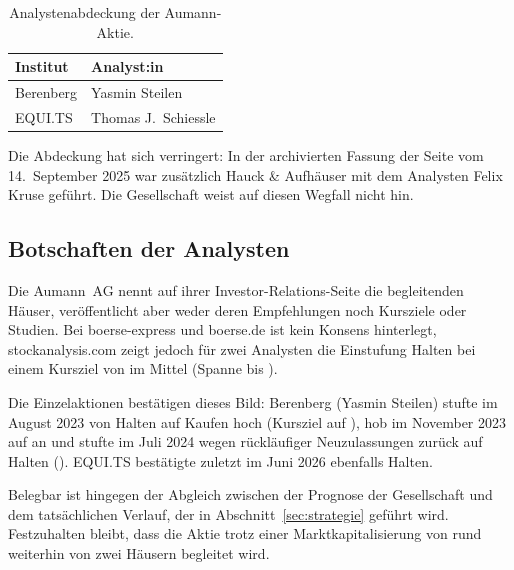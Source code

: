 \begin{table}[htbp]
\centering
\caption{Analystenabdeckung der Aumann-Aktie.}
\label{tab:analysten}
\begin{tabular}{@{}ll@{}}
\toprule
\textbf{Institut} & \textbf{Analyst:in}\\
\midrule
Berenberg            & Yasmin Steilen\\
EQUI.TS              & Thomas J.\ Schiessle\\
\bottomrule
\end{tabular}
\end{table}

\noindent Die Abdeckung hat sich verringert: In der archivierten Fassung der
Seite vom 14.~September 2025 war zus\"atzlich Hauck \& Aufh\"auser mit dem
Analysten Felix Kruse gef\"uhrt. Die Gesellschaft
weist auf diesen Wegfall nicht hin.

\subsection{Botschaften der Analysten}
\label{subsec:analystenbotschaften}

Die Aumann~AG nennt auf ihrer Investor-Relations-Seite die begleitenden
H\"auser, ver\"offentlicht aber weder deren Empfehlungen noch Kursziele oder
Studien. Bei boerse-express und boerse.de ist
kein Konsens hinterlegt,
stockanalysis.com zeigt jedoch f\"ur zwei Analysten die Einstufung Halten
bei einem Kursziel von im Mittel \EURje{\KurszielKonsensDurchschnitt}
(Spanne \EURje{\KurszielKonsensTief} bis
\EURje{\KurszielKonsensHoch}).

Die Einzelaktionen best\"atigen dieses Bild: Berenberg (Yasmin Steilen)
stufte im August 2023 von Halten auf Kaufen hoch (Kursziel
\EURje{\KurszielBerenbergVorHochstufung} auf
\EURje{\KurszielBerenbergHochstufung}), hob im November 2023 auf
\EURje{\KurszielBerenbergAnhebung} an und
stufte im Juli 2024 wegen r\"uckl\"aufiger Neuzulassungen zur\"uck auf
Halten (\EURje{\KurszielBerenbergRueckstufung}). EQUI.TS best\"atigte zuletzt im
Juni 2026 ebenfalls Halten.

Belegbar ist hingegen der Abgleich zwischen der Prognose der Gesellschaft und
dem tats\"achlichen Verlauf, der in Abschnitt~\ref{sec:strategie} gef\"uhrt
wird. Festzuhalten bleibt, dass die Aktie trotz einer Marktkapitalisierung von
rund \MioEUR{\MarktkapZFV} weiterhin von zwei H\"ausern begleitet wird.
